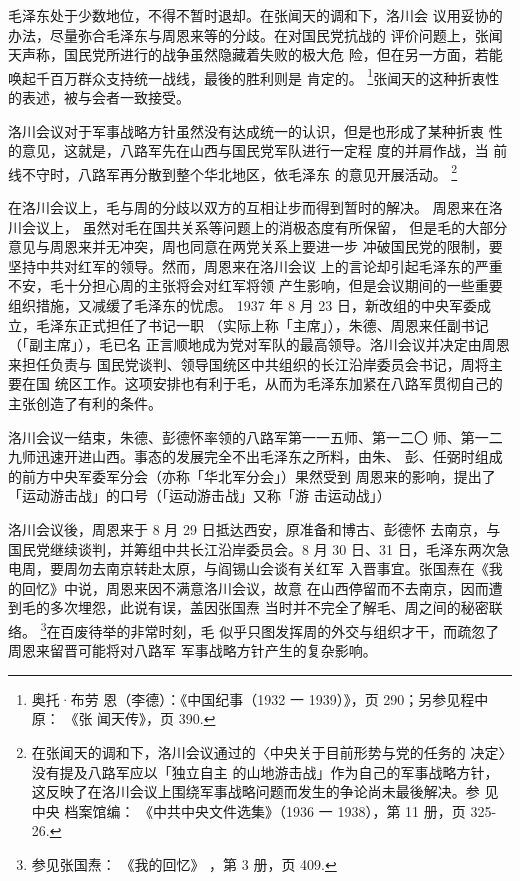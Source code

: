 毛泽东处于少数地位，不得不暂时退却。在张闻天的调和下，洛川会 议用妥协的
办法，尽量弥合毛泽东与周恩来等的分歧。在对国民党抗战的 评价问题上，张闻
天声称，国民党所进行的战争虽然隐藏着失败的极大危 险，但在另一方面，若能
唤起千百万群众支持统一战线，最後的胜利则是 肯定的。 \footnote{奥托·布劳
恩（李德）：《中国纪事（1932 一 1939）》，页 290；另参见程中原：   《张
闻天传》，页 390.}张闻天的这种折衷性的表述，被与会者一致接受。

洛川会议对于军事战略方针虽然没有达成统一的认识，但是也形成了某种折衷
性的意见，这就是，八路军先在山西与国民党军队进行一定程 度的并肩作战，当
前线不守时，八路军再分散到整个华北地区，依毛泽东 的意见开展活动。
\footnote{在张闻天的调和下，洛川会议通过的〈中央关于目前形势与党的任务的
决定〉没有提及八路军应以「独立自主 的山地游击战」作为自己的军事战略方针，
这反映了在洛川会议上围绕军事战略问题而发生的争论尚未最後解决。参 见中央
档案馆编： 《中共中央文件选集》（1936 一 1938），第 11 册，页 325-26.} 

在洛川会议上，毛与周的分歧以双方的互相让步而得到暂时的解决。
周恩来在洛川会议上，
虽然对毛在国共关系等问题上的消极态度有所保留，
但是毛的大部分意见与周恩来并无冲突，周也同意在两党关系上要进一步
冲破国民党的限制，要坚持中共对红军的领导。然而，周恩来在洛川会议
上的言论却引起毛泽东的严重不安，毛十分担心周的主张将会对红军将领
产生影响，但是会议期间的一些重要组织措施，又减缓了毛泽东的忧虑。
1937 年 8 月 23 日，新改组的中央军委成立，毛泽东正式担任了书记一职
（实际上称「主席」），朱德、周恩来任副书记（「副主席」），毛已名
正言顺地成为党对军队的最高领导。洛川会议并决定由周恩来担任负责与
国民党谈判、领导国统区中共组织的长江沿岸委员会书记，周将主要在国
统区工作。这项安排也有利于毛，从而为毛泽东加紧在八路军贯彻自己的
主张创造了有利的条件。

洛川会议一结束，朱德、彭德怀率领的八路军第一一五师、第一二〇
师、第一二九师迅速开进山西。事态的发展完全不出毛泽东之所料，由朱、
彭、任弼时组成的前方中央军委军分会（亦称「华北军分会」）果然受到
周恩来的影响，提出了「运动游击战」的口号（「运动游击战」又称「游
击运动战」）
 
洛川会议後，周恩来于 8 月 29 日抵达西安，原准备和博古、彭德怀
去南京，与国民党继续谈判，并筹组中共长江沿岸委员会。8 月 30 日、31
日，毛泽东两次急电周，要周勿去南京转赴太原，与阎锡山会谈有关红军
入晋事宜。张国焘在《我的回忆》中说，周恩来因不满意洛川会议，故意
在山西停留而不去南京，因而遭到毛的多次埋怨，此说有误，盖因张国焘
当时并不完全了解毛、周之间的秘密联络。 \footnote{参见张国焘：
《我的回忆》
，第 3 册，页 409.}在百废待举的非常时刻，毛
似乎只图发挥周的外交与组织才干，而疏忽了周恩来留晋可能将对八路军
军事战略方针产生的复杂影响。
 
